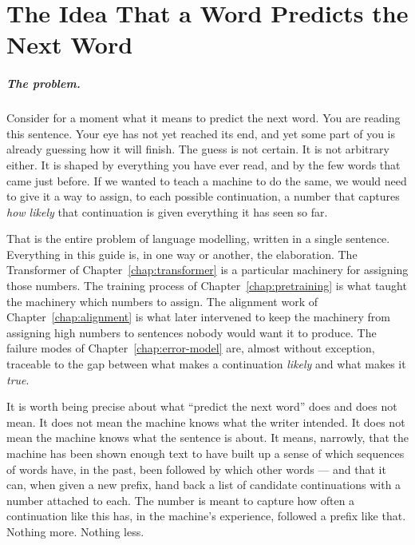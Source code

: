 
\chapter{The Idea That a Word Predicts the Next Word}
\label{chap:stat-foundations}
\label{ntg:ch1}

\scenelabel
\begin{scenestrip}
\end{scenestrip}

\paragraph{The problem.} Consider for a moment what it means to predict the next word. You
are reading this sentence. Your eye has not yet reached its end,
and yet some part of you is already guessing how it will finish.
The guess is not certain. It is not arbitrary either. It is
shaped by everything you have ever read, and by the few words
that came just before. If we wanted to teach a machine to do the
same, we would need to give it a way to assign, to each possible
continuation, a number that captures \emph{how likely} that
continuation is given everything it has seen so far.

That is the entire problem of language modelling, written in a
single sentence. Everything in this guide is, in one way or
another, the elaboration. The Transformer of Chapter~\ref{chap:transformer} is a
particular machinery for assigning those numbers. The training
process of Chapter~\ref{chap:pretraining} is what taught the machinery which numbers
to assign. The alignment work of Chapter~\ref{chap:alignment} is what later
intervened to keep the machinery from assigning high numbers to
sentences nobody would want it to produce. The failure modes of
Chapter~\ref{chap:error-model} are, almost without exception, traceable to the gap
between what makes a continuation \emph{likely} and what makes
it \emph{true}.

It is worth being precise about what ``predict the next word''
does and does not mean. It does not mean the machine knows what
the writer intended. It does not mean the machine knows what the
sentence is about. It means, narrowly, that the machine has been
shown enough text to have built up a sense of which sequences of
words have, in the past, been followed by which other words ---
and that it can, when given a new prefix, hand back a list of
candidate continuations with a number attached to each. The
number is meant to capture how often a continuation like this
has, in the machine's experience, followed a prefix like that.
Nothing more. Nothing less.

